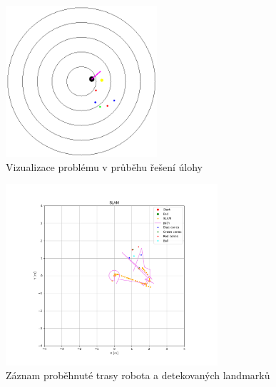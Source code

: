 \documentclass[a4paper,12pt]{article}
\begin{document}
\begin{figure}[H]
    \centering
    \includegraphics[width=0.5\textwidth]{pictures/map3.png}
    \caption{Vizualizace problému v průběhu řešení úlohy}
    \label{fig:slam_in_game}
\end{figure}
\begin{figure}[H]
    \centering
    \includegraphics[width=0.7\textwidth]{pictures/slam3ok.png}
    \caption{Záznam proběhnuté trasy robota a detekovaných landmarků}
    \label{fig:slam_end}
\end{figure}
\end{document}
